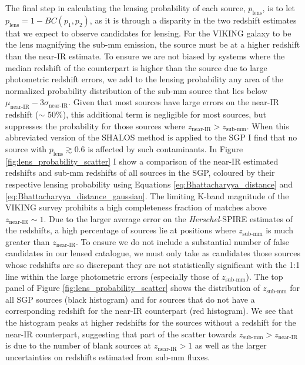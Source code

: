 The final step in calculating the lensing probability of each source, $p_{\textrm{lens}}$, is to let $p_{\textrm{lens}} = 1 - BC(p_1, p_2)$, as it is through a disparity in the two redshift estimates that we expect to observe candidates for lensing. For the VIKING galaxy to be the lens magnifying the sub-mm emission, the source must be at a higher redshift than the near-IR estimate. To ensure we are not biased by systems where the median redshift of the counterpart is higher than the source due to large photometric redshift errors, we add to the lensing probability any area of the normalized probability distribution of the sub-mm source that lies below $\mu_\textrm{near-IR} - 3\sigma_\textrm{near-IR}$. Given that most sources have large errors on the near-IR redshift ($\sim$ 50\%), this additional term is negligible for most sources, but suppresses the probability for those sources where $z_\textrm{near-IR} > z_\textrm{sub-mm}$. When this abbreviated version of the SHALOS method is applied to the SGP I find that no source with $p_{\textrm{lens}} \gtrsim 0.6$ is affected by such contaminants. In Figure \ref{fig:lens_probability_scatter} I show a comparison of the near-IR estimated redshifts and sub-mm redshifts of all sources in the SGP, coloured by their respective lensing probability using Equations \ref{eq:Bhattacharyya_distance} and \ref{eq:Bhattacharyya_distance_gaussian}. The limiting K-band magnitude of the VIKING survey prohibits a high completeness fraction of matches above $z_\textrm{near-IR} \sim 1$. Due to the larger average error on the \textit{Herschel}-SPIRE estimates of the redshifts, a high percentage of sources lie at positions where $z_\textrm{sub-mm}$ is much greater than $z_\textrm{near-IR}$. To ensure we do not include a substantial number of false candidates in our lensed catalogue, we must only take as candidates those sources whose redshifts are so discrepant they are not statistically significant with the 1:1 line within the large photometric errors (especially those of $z_\textrm{sub-mm}$). The top panel of Figure \ref{fig:lens_probability_scatter} shows the distribution of $z_\textrm{sub-mm}$ for all SGP sources (black histogram) and for sources that do not have a corresponding redshift for the near-IR counterpart (red histogram). We see that the histogram peaks at higher redshifts for the sources without a redshift for the near-IR counterpart, suggesting that part of the scatter towards $z_\textrm{sub-mm} > z_\textrm{near-IR}$ is due to the number of blank sources at $z_\textrm{near-IR} > 1$ as well as the larger uncertainties on redshifts estimated from sub-mm fluxes.

